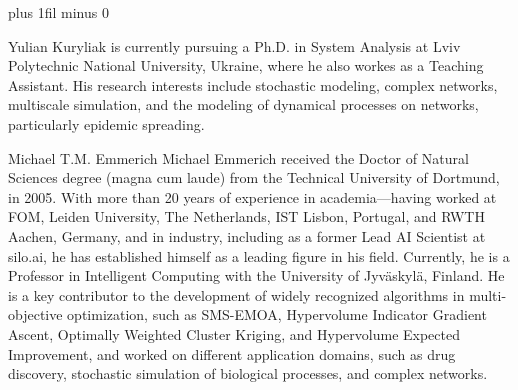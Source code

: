 \documentclass{ieeeaccess}
\newcommand{\michael}[2]{{\color{RoyalBlue}#1}}
\begin{document}

\michael{}{}
\patchcmd{\IEEEbiographynophoto}
  {\baselineskip plus 1fil minus 0\baselineskip}
  {\baselineskip}
  {}{\PackageError{manuscript}{Biography spacing patch failed}{Check the IEEE Access class.}}
\raggedbottom
\begin{IEEEbiographynophoto}{Yulian Kuryliak}
is currently pursuing a Ph.D. in System Analysis at Lviv Polytechnic National University, Ukraine, where he also workes as a Teaching Assistant.
His research interests include stochastic modeling, complex networks, multiscale simulation, and the modeling of dynamical processes on networks, particularly epidemic spreading.
\end{IEEEbiographynophoto}

\begin{IEEEbiographynophoto}{Michael T.M. Emmerich}
Michael Emmerich received the Doctor of Natural Sciences degree (magna cum laude) from the Technical University of Dortmund, in 2005.
With more than 20 years of experience in academia—having worked at FOM, Leiden University, The Netherlands, IST Lisbon, Portugal, and RWTH Aachen, Germany, and in industry, including as a former Lead AI Scientist at silo.ai, he has established himself as a leading figure in his field. Currently, he is a Professor in Intelligent Computing with the University of Jyväskylä, Finland. He is a key contributor to the development of widely recognized algorithms in multi-objective optimization, such as SMS-EMOA, Hypervolume Indicator Gradient Ascent, Optimally Weighted Cluster Kriging, and Hypervolume Expected Improvement, and worked on different application domains, such as drug discovery, stochastic simulation of biological processes, and complex networks.
\end{IEEEbiographynophoto}

\EOD
\end{document}
